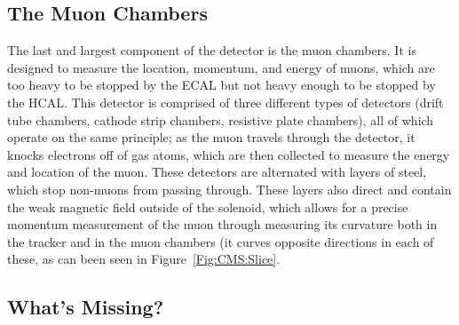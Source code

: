 \subsection{The Muon Chambers}

The last and largest component of the detector is the muon chambers. It is designed to measure the location, momentum, and energy of muons, which are too heavy to be stopped by the ECAL but not heavy enough to be stopped by the HCAL. This detector is comprised of three different types of detectors (drift tube chambers, cathode strip chambers, resistive plate chambers), all of which operate on the same principle; as the muon travels through the detector, it knocks electrons off of gas atoms, which are then collected to measure the energy and location of the muon. These detectors are alternated with layers of steel, which stop non-muons from passing through. These layers also direct and contain the weak magnetic field outside of the solenoid, which allows for a precise momentum measurement of the muon through measuring its curvature both in the tracker and in the muon chambers (it curves opposite directions in each of these, as can been seen in Figure~\ref{Fig:CMS:Slice}.
\vspace{5mm}

\subsection{What's Missing?}


